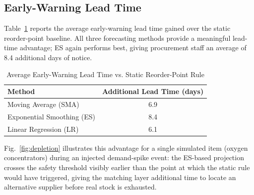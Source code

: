 \documentclass[conference]{IEEEtran}
\begin{document}
\subsection{Early-Warning Lead Time}

Table~\ref{tab:leadtime} reports the average early-warning lead time gained over the static reorder-point baseline. All three forecasting methods provide a meaningful lead-time advantage; ES again performs best, giving procurement staff an average of 8.4 additional days of notice.

\begin{table}[htbp]
\caption{Average Early-Warning Lead Time vs. Static Reorder-Point Rule}
\begin{center}
\begin{tabular}{@{}lc@{}}
\toprule
\textbf{Method} & \textbf{Additional Lead Time (days)} \\
\midrule
Moving Average (SMA) & 6.9 \\
Exponential Smoothing (ES) & 8.4 \\
Linear Regression (LR) & 6.1 \\
\bottomrule
\end{tabular}
\label{tab:leadtime}
\end{center}
\end{table}

Fig.~\ref{fig:depletion} illustrates this advantage for a single simulated item (oxygen concentrators) during an injected demand-spike event: the ES-based projection crosses the safety threshold visibly earlier than the point at which the static rule would have triggered, giving the matching layer additional time to locate an alternative supplier before real stock is exhausted.
\end{document}
